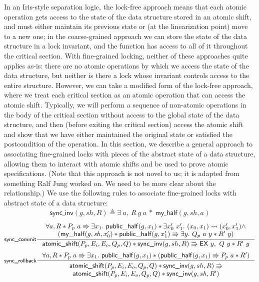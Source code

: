 \documentclass[acmsmall,screen]{acmart}\settopmatter{printfolios=true}
\begin{document}
In an Iris-style separation logic, the lock-free approach means that each atomic operation gets access to the state of the data structure stored in an atomic shift, and must either maintain its previous state or (at the linearization point) move to a new one; in the coarse-grained approach we can store the state of the data structure in a lock invariant, and the function has access to all of it throughout the critical section. With fine-grained locking, neither of these approaches quite applies as-is: there are no atomic operations by which we access the state of the data structure, but neither is there a lock whose invariant controls access to the entire structure. However, we can take a modified form of the lock-free approach, where we treat each critical section as an atomic operation that can access the atomic shift. Typically, we will perform a sequence of non-atomic operations in the body of the critical section without access to the global state of the data structure, and then (before exiting the critical section) access the atomic shift and show that we have either maintained the original state or satisfied the postcondition of the operation. In this section, we describe a general approach to associating fine-grained locks with pieces of the abstract state of a data structure, allowing them to interact with atomic shifts and be used to prove atomic specifications. (Note that this approach is not novel to us; it is adapted from something Ralf Jung worked on. We need to be more clear about the relationship.)
 We use the following rules to associate fine-grained locks with abstract state of a data structure:
\begin{align*}
    \textsf{sync\_inv}(g,sh,R) \triangleq  \exists\ a,\ R\ g\ a\ *\ \textsf{my\_half}(g,sh,a)   \end{align*}
$$\inference[\textsf{sync\_commit}]{\forall a, R * P_p\ a \Rrightarrow \exists x_1.\ \mathsf{public\_half}(g, x_1) * \exists x_0'\ x_1'.\ (x_0, x_1) \leadsto (x_0', x_1') \land \\(\mathsf{my\_half}(g, \mathit{sh}, x_0') * \mathsf{public\_half}(g, x_1') \Rrightarrow \exists y.\ Q_p\ a\ y * R'\ y)}{\textsf{atomic\_shift}(P_p, E_i, E_o, Q_p, Q) *  \textsf{sync\_inv}(g,sh,R) \Rrightarrow \mathsf{EX}\ y,\ Q\ y * R'\ y}$$
$$\inference[\textsf{sync\_rollback}]{\forall a, R * P_p\ a \Rrightarrow \exists x_1.\ \mathsf{public\_half}(g, x_1) * (\mathsf{public\_half}(g, x_1) \Rrightarrow P_p\ a * R')}{\begin{array}{c}\textsf{atomic\_shift}(P_p, E_i, E_o, Q_p, Q) * \textsf{sync\_inv}(g,sh,R)  \Rrightarrow \\\textsf{atomic\_shift}(P_p, E_i, E_o, Q_p, Q) * \textsf{sync\_inv}(g,sh,R')\end{array}}$$
\end{document}
